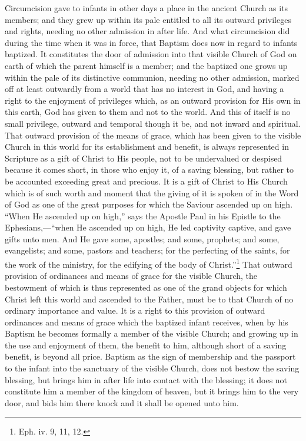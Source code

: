 \documentclass[english,]{book}
\begin{document}
Circumcision gave to infants in other days a place in the ancient Church as its members; and they grew up within its pale entitled to all its outward privileges and rights, needing no other admission in after life. And what circumcision did during the time when it was in force, that Baptism does now in regard to infants baptized. It constitutes the door of admission into that visible Church of God on earth of which the parent himself is a member; and the baptized one grows up within the pale of its distinctive communion, needing no other admission, marked off at least outwardly from a world that has no interest in God, and having a right to the enjoyment of privileges which, as an outward provision for His own in this earth, God has given to them and not to the world. And this of itself is no small privilege, outward and temporal though it be, and not inward and spiritual. That outward provision of the means of grace, which has been given to the visible Church in this world for its establishment and benefit, is always represented in Scripture as a gift of Christ to His people, not to be undervalued or despised because it comes short, in those who enjoy it, of a saving blessing, but rather to be accounted exceeding great and precious. It is a gift of Christ to His Church which is of such worth and moment that the giving of it is spoken of in the Word of God as one of the great purposes for which the Saviour ascended up on high. ``When He ascended up on high,'' says the Apostle Paul in his Epistle to the Ephesians,---``when He ascended up on high, He led captivity captive, and gave gifts unto men. And He gave some, apostles; and some, prophets; and some, evangelists; and some, pastors and teachers; for the perfecting of the saints, for the work of the ministry, for the edifying of the body of Christ.''\footnote{Eph. iv. 9, 11, 12.} That outward provision of ordinances and means of grace for the visible Church, the bestowment of which is thus represented as one of the grand objects for which Christ left this world and ascended to the Father, must be to that Church of no ordinary importance and value. It is a right to this provision of outward ordinances and means of grace which the baptized infant receives, when by his Baptism he becomes formally a member of the visible Church; and growing up in the use and enjoyment of them, the benefit to him, although short of a saving benefit, is beyond all price. Baptism as the sign of membership and the passport to the infant into the sanctuary of the visible Church, does not bestow the saving blessing, but brings him in after life into contact with the blessing; it does not constitute him a member of the kingdom of heaven, but it brings him to the very door, and bids him there knock and it shall be opened unto him.
\end{document}
